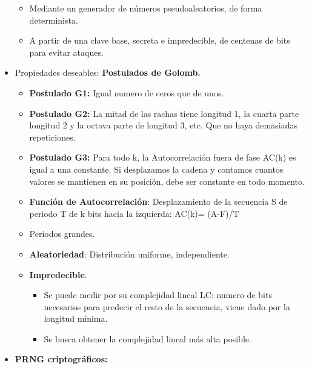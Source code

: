 \documentclass[12pt, twoside, openright]{report} %
\begin{document}
\begin{itemize}
    \begin{itemize}
    \item Mediante un generador de números pseudoaleatorios, de forma
      determinista.
      
    \item A partir de una clave base, secreta e impredecible, de centenas de
      bits para evitar ataques.
      
    \end{itemize}
  \item Propiedades deseables: \textbf{Postulados de Golomb.}
    

    \begin{itemize}
    \item \textbf{Postulado G1:} Igual numero de ceros que de unos.
      
    \item \textbf{Postulado G2:} La mitad de las rachas tiene longitud 1, la
      cuarta parte longitud 2 y la octava parte de longitud 3, etc. Que
      no haya demasiadas repeticiones.
      
    \item \textbf{Postulado G3:} Para todo k, la Autocorrelación fuera de
      fase AC(k) es igual a una constante. Si desplazamos la cadena y
      contamos cuantos valores se mantienen en su posición, debe ser
      constante en todo momento.
      
    \item \textbf{Función de Autocorrelación}: Desplazamiento de la
      secuencia S de periodo T de k bits hacia la izquierda: AC(k)=
      (A-F)/T
      
    \item Periodos grandes.
      
    \item \textbf{Aleatoriedad}: Distribución uniforme, independiente.
      
    \item \textbf{Impredecible}.
      

      \begin{itemize}
      \item Se puede medir por su complejidad lineal LC: numero de bits
        necesarios para predecir el resto de la secuencia, viene dado
        por la longitud mínima.
        
      \item Se busca obtener la complejidad lineal más alta posible.
        
      \end{itemize}
    \end{itemize}
  \item \textbf{PRNG criptográficos:}
    


\end{itemize}
\end{document}
